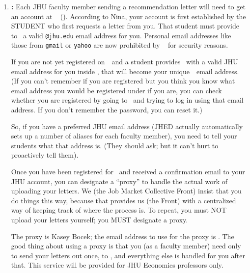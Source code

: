 \documentclass{econtex}
\begin{document}
\begin{enumerate}

\item {\bf \EJM:}
Each JHU faculty member sending a recommendation letter will need to
get an account at \EJM ~ (\EJMLink). According to Nina, your account is first established
by the STUDENT who first requests a letter from you.  That student must 
provide to \EJM~a valid \texttt{@jhu.edu} email address for you.  Personal email addresses like
those from \texttt{gmail} or \texttt{yahoo} are now prohibited by \EJM~
for security reasons.

If you are not yet registered on~\EJM~and a student provides \EJM~with
a valid JHU email address for you inside \EJM, that will become your
unique~\EJM~email address.  (If you can't remember if you are registered 
but you think you know what email address
you would be registered under if you are,  you can check whether you are
registered by going to \EJM~and trying to log in using that email
address.  If you don't remember the password, you can reset it.)  

So, if you have a preferred JHU email address (JHED actually automatically
sets up a number of aliases for each faculty member), you need to tell
your students what that address is.  (They should ask; but it can't
hurt to proactively tell them).

Once you have been registered for \EJM~and received a confirmation
email to your JHU account, you can designate a ``proxy'' to handle the
actual work of uploading your letters.  We (the Job Market Collective
Front) insist that you do things this way, because that provides us (the Front)
with a centralized way of keeping track of where the process is.  To
repeat, you must NOT upload your letters yourself; you MUST designate
a proxy.

The proxy is Kasey Bocek; the email address to use for the proxy is
\JMStaffEmail.  The good thing about using a proxy is that you (as a faculty member)
need only to send your letters out once, to \JMStaffEmail, and everything 
else is handled for you after that. This service will be provided for JHU Economics professors only.

\begin{comment}
\textcolor{red}{
\item {\bf \AJO:}
Each JHU faculty member must register at \AJOLink~ and enter Kasey Bocek as their proxy, using the
\JMStaffEmail~ email address. To do this, log in to your account and click on the `proxy' link near the bottom. This only needs to be done once and the proxy works for all applicants the faculty may have on the job market that year.}
\end{comment}


\end{enumerate}
\end{document}
